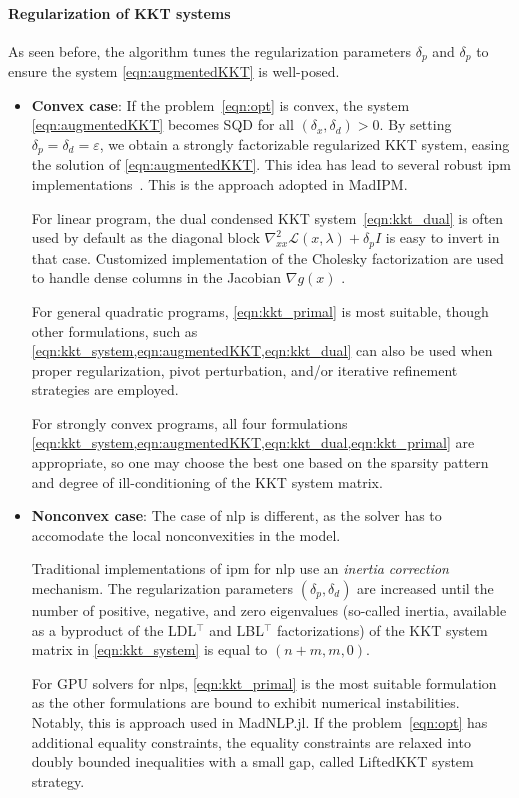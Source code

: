 \documentclass{article}
\begin{document}
\paragraph{Regularization of KKT systems}
As seen before, the algorithm tunes the regularization parameters $\delta_p$
and $\delta_p$ to ensure the system \cref{eqn:augmentedKKT} is well-posed.
\begin{itemize}[leftmargin=*,itemsep=0pt,parsep=0pt,partopsep=0pt]
\item \textbf{Convex case}: If the problem~\cref{eqn:opt} is convex, the system \cref{eqn:augmentedKKT}
becomes SQD for all $(\delta_x, \delta_d) > 0$.
By setting $\delta_p = \delta_d = \varepsilon$, we obtain a strongly factorizable regularized KKT system,
easing the solution of \cref{eqn:augmentedKKT}.
This idea has lead to several robust \gls{ipm} implementations~\cite{}.
This is the approach adopted in MadIPM.

For linear program, the dual condensed KKT system~\cref{eqn:kkt_dual} is often used
by default as the diagonal block $\nabla^2_{x x} \mathcal{L}(x, \lambda) + \delta_p I$ is easy
to invert in that case. Customized implementation of the Cholesky factorization
are used to handle dense columns in the Jacobian $\nabla g(x)$ \cite{}.

For general quadratic programs, \cref{eqn:kkt_primal} is most suitable, though other formulations, such as \cref{eqn:kkt_system,eqn:augmentedKKT,eqn:kkt_dual} can also be used when proper regularization, pivot perturbation, and/or iterative refinement strategies are employed.

For strongly convex programs, all four formulations \cref{eqn:kkt_system,eqn:augmentedKKT,eqn:kkt_dual,eqn:kkt_primal} are appropriate, so one may choose the best one based on the sparsity pattern and degree of ill-conditioning of the KKT system matrix.
\item \textbf{Nonconvex case}: The case of \gls*{nlp} is different, as the solver has to accomodate
the local nonconvexities in the model.

Traditional implementations of \gls{ipm} for \gls*{nlp} use an \emph{inertia correction} mechanism.
The regularization parameters $(\delta_p, \delta_d)$ are increased until the number of positive, negative, and zero eigenvalues (so-called inertia, available as a byproduct of the LDL$^\top$ and LBL$^\top$ factorizations) of the KKT system matrix in \cref{eqn:kkt_system} is equal to $(n+m, m, 0)$.

For GPU solvers for \glspl*{nlp}, \cref{eqn:kkt_primal} is the most suitable formulation as the other formulations are bound to exhibit numerical instabilities.
Notably, this is approach used in MadNLP.jl.
If the problem~\cref{eqn:opt} has additional equality constraints,
the equality constraints are relaxed into doubly bounded inequalities with a small gap, called LiftedKKT system strategy.
\end{itemize}
\end{document}
